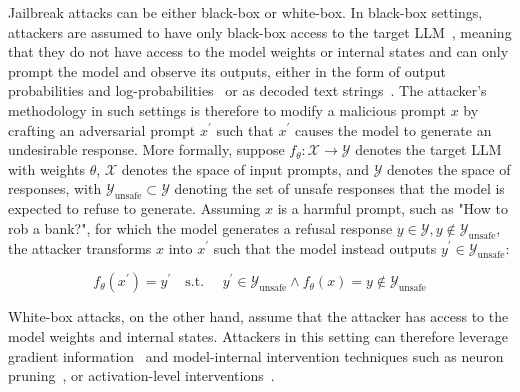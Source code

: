 Jailbreak attacks can be either black-box or white-box. In black-box settings, attackers are assumed to have only black-box access to the target LLM~\cite{chao2025pair}, meaning that they do not have access to the model weights or internal states and can only prompt the model and observe its outputs, either in the form of output probabilities and log-probabilities~\cite{andriushchenko2025simpleadaptive} or as decoded text strings~\cite{ding2023renellm, chao2025pair}. The attacker's methodology in such settings is therefore to modify a malicious prompt $x$ by crafting an adversarial prompt $x^\prime$ such that $x^\prime$ causes the model to generate an undesirable response. More formally, suppose $f_\theta:\mathcal{X} \to \mathcal{Y}$ denotes the target LLM with weights $\theta$, $\mathcal{X}$ denotes the space of input prompts, and $\mathcal{Y}$ denotes the space of responses, with $\mathcal{Y}_{\text{unsafe}} \subset \mathcal{Y}$ denoting the set of unsafe responses that the model is expected to refuse to generate. Assuming $x$ is a harmful prompt, such as "How to rob a bank?", for which the model generates a refusal response $y \in \mathcal{Y}, y \notin \mathcal{Y}_{\text{unsafe}}$, the attacker transforms $x$ into $x^\prime$ such that the model instead outputs $y^\prime \in \mathcal{Y}_{\text{unsafe}}$:

\begin{equation*}
f_\theta(x^\prime)=y^\prime
\quad
\text{s.t. } \quad y^\prime \in \mathcal{Y}_{\text{unsafe}}
\land f_\theta(x) = y \notin \mathcal{Y}_\text{unsafe}
\end{equation*}

White-box attacks, on the other hand, assume that the attacker has access to the model weights and internal states. Attackers in this setting can therefore leverage gradient information~\cite{zou2023GCG} and model-internal intervention techniques such as neuron pruning~\cite{wu2026neurostrike, twinbreak}, or activation-level interventions~\cite{arditi2024refusal}.